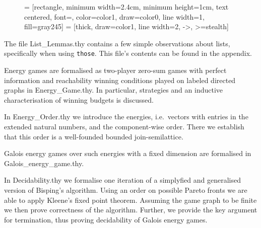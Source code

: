 \begin{figure}[H]
\begin{center}


 = [rectangle, minimum width=2.4cm, minimum height=1cm, text centered, font=\normalsize, color=color1, draw=color0, line width=1, fill=gray245]
 = [thick, draw=color1, line width=2, ->, >=stealth]

\end{center}
\end{figure}

The file List\_Lemmas.thy contains a few simple observations about lists, specifically when using \texttt{those}. This file's contents can be found in the appendix.

Energy games are formalised as two-player zero-sum games with perfect information and reachability winning conditions played on labeled directed graphs in Energy\_Game.thy. 
In particular, strategies and an inductive characterisation of winning budgets is discussed.

In Energy\_Order.thy we introduce the energies, i.e.\ vectors with entries in the extended natural numbers, and the component-wise order. There we establish that this order is a well-founded bounded join-semilattice. 

Galois energy games over such energies with a fixed dimension are formalised in Galois\_energy\_game.thy. 

In Decidability.thy we formalise one iteration of a simplyfied and generalised version of Bisping's algorithm. Using an order on possible Pareto fronts we are able to apply Kleene's fixed point theorem. Assuming the game graph to be finite we then prove correctness of the algorithm. Further, we provide the key argument for termination, thus proving decidability of Galois energy games.

